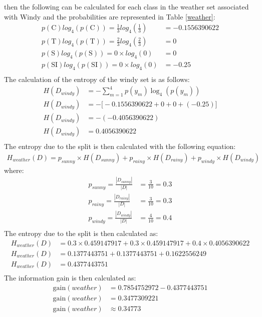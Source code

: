 \documentclass[10pt]{article}
\begin{document}
then the following can be calculated for each class in the weather set associated with Windy and the probabilities
are represented in Table \ref{weather}:
\begin{align*}
    p(\text{C}) log_4 \left( p(\text{C}) \right) = \frac{1}{3} log_4 \left( \frac{1}{3} \right) &= -0.1556390622\\
    p(\text{T}) log_4 \left( p(\text{T}) \right) = \frac{2}{3} log_4 \left( \frac{2}{3} \right) &= 0\\
    p(\text{S}) log_4 \left( p(\text{S}) \right) = 0 \times log_4 \left( 0 \right) &= 0\\
    p(\text{SI}) log_4 \left( p(\text{SI}) \right) = 0 \times log_4 \left( 0 \right) &= -0.25\\
\end{align*}
The calculation of the entropy of the windy set is as follows:
\begin{align*}
    H(D_{windy}) &= - \sum_{m=1}^{4} p(y_m) \log_4 \left( p(y_m) \right) \\
    H(D_{windy}) &= - \big[ -0.1556390622 + 0 + 0 + (-0.25)\big] \\
    H(D_{windy}) &= - (-0.4056390622) \\
    H(D_{windy}) &= 0.4056390622 \\
\end{align*}
The entropy due to the split is then calculated with the following equation:
\begin{align*}
    H_{weather}(D) = p_{sunny} \times H(D_{sunny}) + p_{rainy} \times H(D_{rainy}) + p_{windy} \times H(D_{windy})
\end{align*}
where:
\begin{align*}
    p_{sunny} = \frac{|D_{sunny}|}{|D|} &= \frac{3}{10} = 0.3\\
    p_{rainy} = \frac{|D_{rainy}|}{|D|} &= \frac{3}{10} = 0.3\\
    p_{windy} = \frac{|D_{windy}|}{|D|} &= \frac{4}{10} = 0.4\\
\end{align*}
The entropy due to the split is then calculated as:
\begin{align*}
    H_{weather}(D) &= 0.3 \times 0.459147917 + 0.3 \times 0.459147917 + 0.4 \times 0.4056390622\\
    H_{weather}(D) &= 0.1377443751 + 0.1377443751 + 0.1622556249 \\
    H_{weather}(D) &= 0.4377443751 \\
\end{align*}
The information gain is then calculated as:
\begin{align*}
    \text{gain}(weather) &= 0.7854752972 - 0.4377443751 \\
    \text{gain}(weather) &= 0.3477309221 \\
    \text{gain}(weather) &\approx 0.34773
\end{align*}
\end{document}
